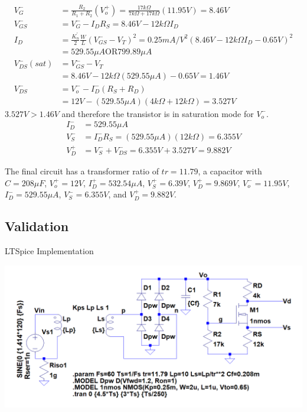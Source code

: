\documentclass[12pt,letterpaper,titlepage]{article}
\begin{document}
\begin{raggedright}
\begin{align*}
\end{align*}
\begin{align*}
   V_G^-
    &= \frac{R_2}{R_1 + R_2}(V_o^+)
     = \frac{17k\Omega}{7k\Omega+17k\Omega}(11.95V)
     = 8.46V
\\ V_{GS}^-
    &= V_G^- - I_DR_S
     = 8.46V - 12k\Omega I_D
\\ I_D
	&= \frac{K_n^\prime}{2}\frac{W}{L} (V_{GS}^- - V_{T})^2
	 = 0.25 mA/V^2 (8.46V - 12k\Omega I_D - 0.65V)^2
\\	&= 529.55\mu A \text{OR} 799.89\mu A
\\ V_{DS}^-(sat)
	&= V_{GS}^- - V_T
\\	&= 8.46V - 12k\Omega (529.55\mu A) - 0.65V
	 = 1.46V
\\ V_{DS}^-
	&= V_o^- - I_D^-(R_S + R_D)
\\  &= 12V - (529.55\mu A)(4k\Omega + 12k\Omega)
	 = 3.527V
\end{align*}
$3.527V > 1.46V$ and therefore the transistor is in saturation mode for $V_o^-$.
\begin{align*}
   I_D^-
   &= 529.55\mu A
\\ V_S^-
   &= I_D^-R_S
    = (529.55\mu A)(12k\Omega)
    = 6.355V
\\ V_D^+
   &= V_S^- + V_{DS}^-
    = 6.355V + 3.527V
    = 9.882V
\end{align*}

The final circuit has a transformer ratio of $tr = 11.79$, a capacitor with $C = 208\mu F$, $V_o^+ = 12V$, $I_D^+ = 532.54\mu A$, $V_S^+ = 6.39V$, $V_D^+ = 9.869V$, $V_o^- = 11.95V$, $I_D^- = 529.55\mu A$, $V_S^- = 6.355V$, and $V_D^+ = 9.882V$.

\subsection{Validation}

\begin{center}
LTSpice Implementation

\includegraphics[width=\textwidth, height=\textheight, keepaspectratio=true]{ds1b}


\end{center}
\end{raggedright}
\end{document}
